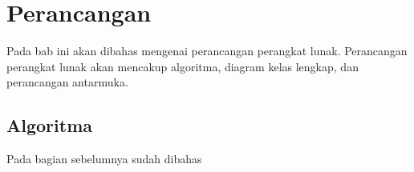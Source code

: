 \chapter{Perancangan}
\label{chap:perancangan}

Pada bab ini akan dibahas mengenai perancangan perangkat lunak. Perancangan perangkat lunak akan mencakup algoritma, diagram kelas lengkap, dan perancangan antarmuka.

\section{Algoritma}

Pada bagian sebelumnya sudah dibahas 